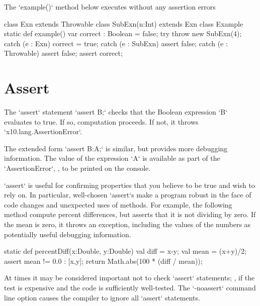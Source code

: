 \begin{ex}
The \xcd`example()` method below executes without any assertion errors
\begin{xten}
class Exn extends Throwable{}
class SubExn(n:Int) extends Exn{}
class Example {
  static def example() {
    var correct : Boolean = false;
    try {
       throw new SubExn(4);
    }
    catch (e : Exn)          { correct = true; }
    catch (e : SubExn)       { assert false; }
    catch (e : Throwable)    { assert false; }
    assert correct; 
  }
}
\end{xten}

\end{ex}


\section{Assert}

The \xcd`assert` statement 
\xcd`assert B;` 
checks that the Boolean expression \xcd`B` evaluates to true.  If so,
computation proceeds.  If not, it throws \xcd`x10.lang.AssertionError`.

The extended form 
\xcd`assert B:A;`
is similar, but provides more debugging information.  The value of the
expression \xcd`A` is available as part of the \xcd`AssertionError`, \eg, to
be printed on the console.

\begin{ex}
\xcd`assert` is useful for confirming properties that you believe to be true
and wish to rely on.  In particular, well-chosen \xcd`assert`s make a program
robust in the face of code changes and unexpected uses of methods.
For example, the following method compute percent differences, but asserts
that it is not dividing by zero.  If the mean is zero, it throws an exception,
including the values of the numbers as potentially useful debugging
information. 
\begin{xten}
static def percentDiff(x:Double, y:Double) {
  val diff = x-y;
  val mean = (x+y)/2;
  assert mean != 0.0  : [x,y]; 
  return Math.abs(100 * (diff / mean));
}
\end{xten}

\end{ex}


At times it may be considered important not to check \xcd`assert` statements;
\eg, if the test is expensive and the code is sufficiently well-tested.  The
\xcd`-noassert` command line option causes the compiler to ignore all
\xcd`assert` statements. 
